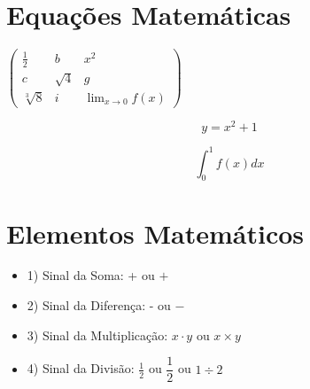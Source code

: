 \documentclass[12pt,a4paper,twoside]{report}
\begin{document}
\section{Equações Matemáticas}
\begin{center}
$ 
\left(\begin{array}{ccc}
    \frac{1}{2}     &       b       &   x^2\\
    c               &   \sqrt{4}    &   g\\
    \sqrt[3]{8}     &       i       &   \displaystyle\lim_{x\rightarrow 0}f(x)
\end{array}\right)
$
\end{center}


\begin{equation}
    y=x^2+1
\end{equation}

\begin{equation}
    \displaystyle\int_0^1 f(x)dx
\end{equation}

\pagebreak
\section{Elementos Matemáticos}

\begin{itemize} %
    \item [] 1) Sinal da Soma: + ou $+$
    \item [] 2) Sinal da Diferença: - ou $-$
    \item [] 3) Sinal da Multiplicação: $x\cdot y$ ou $x\times y$
    \item [] 4) Sinal da Divisão: $\frac{1}{2}$ ou $\dfrac{1}{2}$ ou $1\div 2$
\end{itemize}
\end{document}
